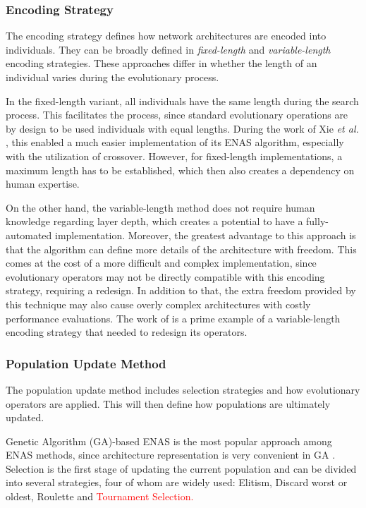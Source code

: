 \documentclass[10pt,        %
               a4paper,     %
               journal,     %
               ]{IEEEtran}
\begin{document}
\subsubsection{Encoding Strategy}
The encoding strategy defines how network architectures are encoded into individuals. They can be broadly defined in
\textit{fixed-length} and \textit{variable-length} encoding strategies. These approaches differ in whether the length
of an individual varies during the evolutionary process.

In the fixed-length variant, all individuals have the same length during the search process. This facilitates
the process, since standard evolutionary operations are by design to be used individuals with equal lengths. During
the work of Xie \textit{et al.} \cite{xie2017genetic}, this enabled a much easier implementation of its ENAS
algorithm, especially with the utilization of crossover. However, for fixed-length implementations, a maximum
length has to be established, which then also creates a dependency on human expertise.

On the other hand, the variable-length method does not require human knowledge regarding layer depth, which creates
a potential to have a fully-automated implementation. Moreover, the greatest advantage to this approach is that the algorithm
can define more details of the architecture with freedom. This comes at the cost of a more difficult and complex implementation,
since evolutionary operators may not be directly compatible with this encoding strategy, requiring a redesign. In addition to that,
the extra freedom provided by this technique may also cause overly complex architectures
with costly performance evaluations. The work of \cite{sun2019evolving} is a prime example of a variable-length encoding strategy
that needed to redesign its operators.

\subsubsection{Population Update Method}
\label{pop}
The population update method includes selection strategies and how evolutionary operators are applied. This will then
define how populations are ultimately updated.

Genetic Algorithm (GA)-based ENAS is the most popular approach among ENAS methods, since architecture representation is
very convenient in GA \cite{liu2021survey}. Selection is the first stage of updating the current population and can
be divided into several strategies, four of whom are widely used: Elitism, Discard worst or oldest, Roulette and
\textcolor{red}{Tournament Selection. }
\end{document}
